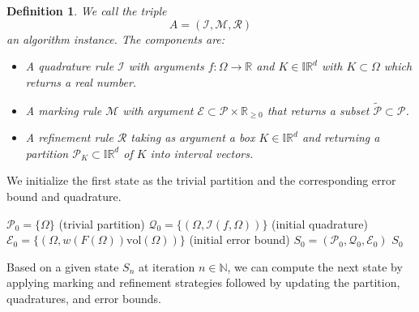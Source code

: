 \documentclass[a4paper, 11pt]{article}
\newtheorem{definition}[theorem]{Definition}
\newcommand{\vol}{\mathrm{vol}}
\begin{document}
	\begin{definition}
		We call the triple
		\begin{equation}
			A = (\mathcal{I}, \mathcal{M}, \mathcal{R})
		\end{equation}
		an algorithm instance. The components are:
		\begin{itemize}
			\item A quadrature rule $\mathcal{I}$ with arguments $f:\Omega \to \mathbb{R}$ and $K \in \mathbb{IR}^d$ with $K\subset \Omega$ which returns a real number.
			\item A marking rule $\mathcal{M}$ with argument $\mathcal{E}\subset \mathcal{P} \times \mathbb{R}_{\geq 0}$ that returns a subset $\widetilde{\mathcal{P}}\subset \mathcal{P}$.
			\item A refinement rule $\mathcal{R}$ taking as argument a box $K\in \mathbb{IR}^d$ and returning a partition $\mathcal{P}_K \subset \mathbb{IR}^d$ of $K$ into interval vectors.
		\end{itemize}
	\end{definition}
	
	We initialize the first state as the trivial partition and the corresponding error bound and quadrature.
	
	\vspace{1em}
	\begin{algorithm}[H]
		\LinesNotNumbered
		\DontPrintSemicolon
		\caption{$\mathrm{Init}_A(P)$}
		\label{alg: initialize state}
		
		\BlankLine
		$\mathcal{P}_0 = \{\Omega\}$ \quad (trivial partition)\;
		$\mathcal{Q}_0 = \{(\Omega, \mathcal{I}(f,\Omega))\}$ \quad (initial quadrature)\; 
		$\mathcal{E}_0 = \{(\Omega, w(F(\Omega))\vol(\Omega))\}$ \quad (initial error bound)\;
		$S_0 = (\mathcal{P}_0, \mathcal{Q}_0, \mathcal{E}_0)$\;
		\Return $S_0$\;
	\end{algorithm}
	\vspace{1em}
	
	
	Based on a given state $S_n$ at iteration $n\in \mathbb{N}$, we can compute the next state by applying marking and refinement strategies followed by updating the partition, quadratures, and error bounds.
	
\end{document}
